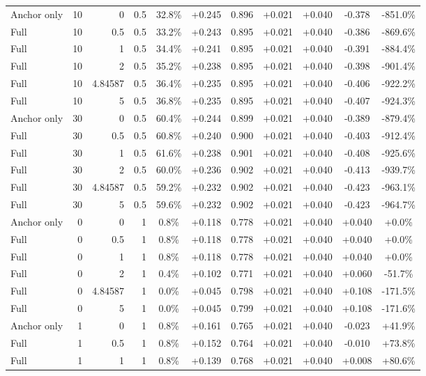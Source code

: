 \begin{table}[htbp]
\begin{tabular}{lrrrccccccc}
Anchor only & 10 & 0 & 0.5 & 32.8\% & +0.245 & 0.896 & +0.021 & +0.040 & -0.378 & -851.0\% \\
Full & 10 & 0.5 & 0.5 & 33.2\% & +0.243 & 0.895 & +0.021 & +0.040 & -0.386 & -869.6\% \\
Full & 10 & 1 & 0.5 & 34.4\% & +0.241 & 0.895 & +0.021 & +0.040 & -0.391 & -884.4\% \\
Full & 10 & 2 & 0.5 & 35.2\% & +0.238 & 0.895 & +0.021 & +0.040 & -0.398 & -901.4\% \\
Full & 10 & 4.84587 & 0.5 & 36.4\% & +0.235 & 0.895 & +0.021 & +0.040 & -0.406 & -922.2\% \\
Full & 10 & 5 & 0.5 & 36.8\% & +0.235 & 0.895 & +0.021 & +0.040 & -0.407 & -924.3\% \\
Anchor only & 30 & 0 & 0.5 & 60.4\% & +0.244 & 0.899 & +0.021 & +0.040 & -0.389 & -879.4\% \\
Full & 30 & 0.5 & 0.5 & 60.8\% & +0.240 & 0.900 & +0.021 & +0.040 & -0.403 & -912.4\% \\
Full & 30 & 1 & 0.5 & 61.6\% & +0.238 & 0.901 & +0.021 & +0.040 & -0.408 & -925.6\% \\
Full & 30 & 2 & 0.5 & 60.0\% & +0.236 & 0.902 & +0.021 & +0.040 & -0.413 & -939.7\% \\
Full & 30 & 4.84587 & 0.5 & 59.2\% & +0.232 & 0.902 & +0.021 & +0.040 & -0.423 & -963.1\% \\
Full & 30 & 5 & 0.5 & 59.6\% & +0.232 & 0.902 & +0.021 & +0.040 & -0.423 & -964.7\% \\
Anchor only & 0 & 0 & 1 & 0.8\% & +0.118 & 0.778 & +0.021 & +0.040 & +0.040 & +0.0\% \\
Full & 0 & 0.5 & 1 & 0.8\% & +0.118 & 0.778 & +0.021 & +0.040 & +0.040 & +0.0\% \\
Full & 0 & 1 & 1 & 0.8\% & +0.118 & 0.778 & +0.021 & +0.040 & +0.040 & +0.0\% \\
Full & 0 & 2 & 1 & 0.4\% & +0.102 & 0.771 & +0.021 & +0.040 & +0.060 & -51.7\% \\
Full & 0 & 4.84587 & 1 & 0.0\% & +0.045 & 0.798 & +0.021 & +0.040 & +0.108 & -171.5\% \\
Full & 0 & 5 & 1 & 0.0\% & +0.045 & 0.799 & +0.021 & +0.040 & +0.108 & -171.6\% \\
Anchor only & 1 & 0 & 1 & 0.8\% & +0.161 & 0.765 & +0.021 & +0.040 & -0.023 & +41.9\% \\
Full & 1 & 0.5 & 1 & 0.8\% & +0.152 & 0.764 & +0.021 & +0.040 & -0.010 & +73.8\% \\
Full & 1 & 1 & 1 & 0.8\% & +0.139 & 0.768 & +0.021 & +0.040 & +0.008 & +80.6\% \\

\end{tabular}
\end{table}
